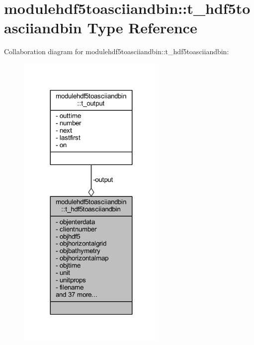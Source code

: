\hypertarget{structmodulehdf5toasciiandbin_1_1t__hdf5toasciiandbin}{}\section{modulehdf5toasciiandbin\+:\+:t\+\_\+hdf5toasciiandbin Type Reference}
\label{structmodulehdf5toasciiandbin_1_1t__hdf5toasciiandbin}


Collaboration diagram for modulehdf5toasciiandbin\+:\+:t\+\_\+hdf5toasciiandbin\+:\nopagebreak
\begin{figure}[H]
\begin{center}
\leavevmode
\includegraphics[width=203pt]{structmodulehdf5toasciiandbin_1_1t__hdf5toasciiandbin__coll__graph}
\end{center}
\end{figure}
